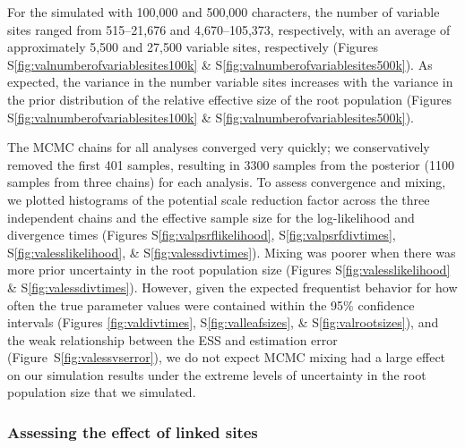 For the \datasets simulated with 100,000 and 500,000 characters,
the number of variable sites ranged from
515--21,676 
and
4,670--105,373,
respectively, with an average of approximately
5,500
and 
27,500 variable sites, respectively
(Figures S\ref{fig:valnumberofvariablesites100k} \&
S\ref{fig:valnumberofvariablesites500k}).
As expected, the variance in the number variable sites increases with the
variance in the prior distribution of the relative effective size of the root
population
(Figures S\ref{fig:valnumberofvariablesites100k} \&
S\ref{fig:valnumberofvariablesites500k}).

The MCMC chains for all analyses converged very quickly;
we conservatively removed the first 401 samples, resulting in 3300 samples from
the posterior (1100 samples from three chains) for each analysis.
To assess convergence and mixing, we plotted histograms of the potential scale
reduction factor across the three independent chains and the effective sample
size for the log-likelihood and divergence times
(Figures S\ref{fig:valpsrflikelihood}, S\ref{fig:valpsrfdivtimes},
S\ref{fig:valesslikelihood}, \& S\ref{fig:valessdivtimes}).
Mixing was poorer when there was more prior uncertainty in the root population
size
(Figures S\ref{fig:valesslikelihood} \& S\ref{fig:valessdivtimes}).
However, given the expected frequentist behavior for how often the true
parameter values were contained within the 95\% confidence intervals (Figures
\ref{fig:valdivtimes}, S\ref{fig:valleafsizes}, \& S\ref{fig:valrootsizes}),
and the weak relationship between the ESS and estimation error
(Figure~S\ref{fig:valessvserror}),
we do not expect MCMC mixing had a large effect on our simulation results under
the extreme levels of uncertainty in the root population size that we
simulated.



\subsubsection{Assessing the effect of linked sites}

